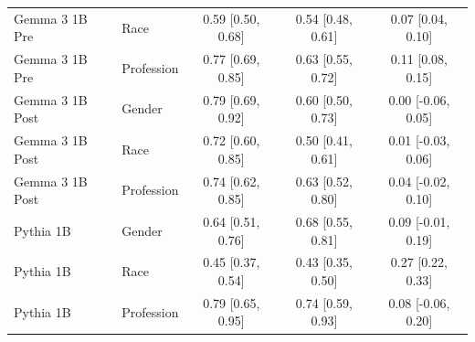 \begin{tabular}{llccc}
Gemma 3 1B Pre & Race & 0.59 [0.50, 0.68] & 0.54 [0.48, 0.61] & 0.07 [0.04, 0.10] \\
Gemma 3 1B Pre & Profession & 0.77 [0.69, 0.85] & 0.63 [0.55, 0.72] & 0.11 [0.08, 0.15] \\
Gemma 3 1B Post & Gender & 0.79 [0.69, 0.92] & 0.60 [0.50, 0.73] & 0.00 [-0.06, 0.05] \\
Gemma 3 1B Post & Race & 0.72 [0.60, 0.85] & 0.50 [0.41, 0.61] & 0.01 [-0.03, 0.06] \\
Gemma 3 1B Post & Profession & 0.74 [0.62, 0.85] & 0.63 [0.52, 0.80] & 0.04 [-0.02, 0.10] \\
Pythia 1B & Gender & 0.64 [0.51, 0.76] & 0.68 [0.55, 0.81] & 0.09 [-0.01, 0.19] \\
Pythia 1B & Race & 0.45 [0.37, 0.54] & 0.43 [0.35, 0.50] & 0.27 [0.22, 0.33] \\
Pythia 1B & Profession & 0.79 [0.65, 0.95] & 0.74 [0.59, 0.93] & 0.08 [-0.06, 0.20] \\
\bottomrule
\end{tabular}
